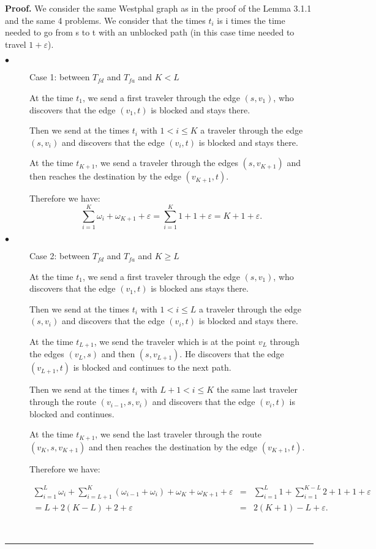 \documentclass[letter-size, 11pt]{article}
\newenvironment{proof}[1][Proof]{\textbf{#1.} }{\ \rule{0.5em}{0.5em}}
\begin{document}
\begin{proof} We consider the same Westphal graph as in the proof of the Lemma 3.1.1 and the same 4 problems. We consider that the times $t_i$ is i times the time needed to go from s to t with an unblocked path (in this case time needed to travel $1 + \varepsilon$). 

\begin{description}
\item[$\bullet$] Case 1: between $T_{fd}$ and $T_{fa}$ and $K<L$

At the time $t_1$, we send a first traveler through the edge $(s,v_1)$, who discovers that the edge $(v_1,t)$ is blocked and stays there.

Then we send at the times $t_i$ with $1 < i \leq K$ a traveler through the edge $(s,v_i)$ and discovers that the edge $(v_i,t)$ is blocked and stays there.

At the time $t_{K+1}$, we send a traveler through the edges $(s,v_{K+1})$ and then reaches the destination by the edge $(v_{K+1},t)$. 

Therefore we have: 
\[
\sum_{i=1}^{K} \omega_{i} + \omega_{K+1} + \varepsilon = \sum_{i=1}^{K} 1 + 1 + \varepsilon = K + 1 + \varepsilon.
\]

\item[$\bullet$] Case 2: between $T_{fd}$ and $T_{fa}$ and $K \geq L$

At the time $t_1$, we send a first traveler through the edge $(s,v_1)$, who discovers that the edge $(v_1,t)$ is blocked ans stays there.

Then we send at the times $t_i$ with $1 < i \leq L$ a traveler through the edge $(s,v_i)$ and discovers that the edge $(v_i,t)$ is blocked and stays there.

At the time $t_{L+1}$, we send the traveler which is at the point $v_L$ through the edges $(v_{L},s)$ and then $(s,v_{L+1})$. He discovers that the edge $(v_{L+1},t)$ is blocked and continues to the next path.

Then we send at the times $t_i$ with $L+1 < i \leq K$ the same last traveler through the route $(v_{i-1},s,v_i)$ and discovers that the edge $(v_i,t)$ is blocked and continues.

At the time $t_{K+1}$, we send the last traveler through the route $(v_K,s,v_{K+1})$ and then reaches the destination by the edge $(v_{K+1},t)$. 

Therefore we have: 

\begin{eqnarray}
\sum_{i=1}^{L} \omega_{i} + \sum_{i=L+1}^{K}(\omega_{i-1} + \omega_{i} ) + \omega_{K} + \omega_{K+1} + \varepsilon
&=&\sum_{i=1}^{L} 1 + \sum_{i=1}^{K-L}2 + 1 + 1 + \varepsilon \nonumber\\
= L + 2(K - L) + 2 + \varepsilon
&=& 2(K + 1 ) - L + \varepsilon.\nonumber
\end{eqnarray}


\end{description}
\end{proof}
\end{document}
